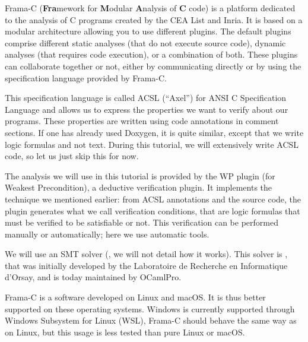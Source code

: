 





Frama-C (\textbf{Fra}mework for \textbf{M}odular \textbf{A}nalysis of
\textbf{C} code) is a platform
dedicated to the analysis of C programs created by the CEA List and
Inria. It is based on a modular architecture allowing you to use different
plugins. The default plugins comprise different static analyses (that
do not execute source code), dynamic analyses (that requires code
execution), or a combination of both. These plugins can collaborate together
or not, either by communicating directly or by using the specification
language provided by Frama-C.





This specification language is called ACSL (``Axel'') for
ANSI C Specification Language and allows us to express the
properties we want to verify about our programs. These properties are
written using code annotations in comment sections. If one has
already used Doxygen, it is quite similar, except that we write logic
formulas and not text. During this tutorial, we will extensively write
ACSL code, so let us just skip this for now.



The analysis we will use in this tutorial is provided by the WP plugin
(for Weakest Precondition), a deductive verification plugin. It implements
the technique we mentioned earlier: from
ACSL annotations and the source code, the plugin generates what we call
verification conditions, that are logic formulas that must be verified to be
satisfiable or not. This verification can be performed manually or
automatically; here we use automatic tools.



We will use an SMT solver
(, we will not detail how it works). This solver is
, that was initially developed
by the Laboratoire de Recherche en Informatique d'Orsay, and is today
maintained by OCamlPro.






Frama-C is a software developed on Linux and macOS. It is thus better supported
on these operating systems. Windows is currently supported through Windows
Subsystem for Linux (WSL), Frama-C should behave the same way as on Linux, but
this usage is less tested than pure Linux or macOS.


